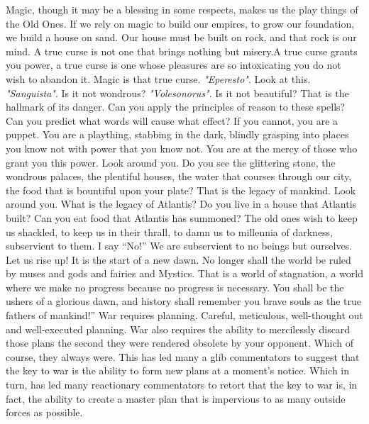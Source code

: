 Magic, though it may be a blessing in some respects, makes us the play things of the Old Ones. If we rely on magic to build our empires, to grow our foundation, we build a house on sand. Our house must be built on rock, and that rock is our mind. A true curse is not one that brings nothing but misery.\SmallVSpace A true curse grants you power, a true curse is one whose pleasures are so intoxicating you do not wish to abandon it. Magic is that true curse.
\SmallVSpace
\emph{"Eperesto"}. Look at this. \emph{"Sanguista"}. Is it not wondrous? \emph{"Volesonorus"}. Is it not beautiful? That is the hallmark of its danger. Can you apply the principles of reason to these spells? Can you predict what words will cause what effect? If you cannot, you are a puppet. You are a plaything, stabbing in the dark, blindly grasping into places you know not with power that you know not. You are at the mercy of those who grant you this power.
\SmallVSpace
Look around you.
\SmallVSpace
Do you see the glittering stone, the wondrous palaces, the plentiful houses, the water that courses through our city, the food that is bountiful upon your plate? That is the legacy of mankind.
\SmallVSpace
Look around you.
\SmallVSpace
What is the legacy of Atlantis? Do you live in a house that Atlantis built? Can you eat food that Atlantis has summoned? The old ones wish to keep us shackled, to keep us in their thrall, to damn us to millennia of darkness, subservient to them. I say “No!” We are subservient to no beings but ourselves.
\SmallVSpace
Let us rise up! It is the start of a new dawn. No longer shall the world be ruled by muses and gods and fairies and Mystics. That is a world of stagnation, a world where we make no progress because no progress is necessary. You shall be the ushers of a glorious dawn, and history shall remember you brave souls as the true fathers of mankind!”
\simpleline
War requires planning. Careful, meticulous, well-thought out and well-executed planning. War also requires the ability to mercilessly discard those plans the second they were rendered obsolete by your opponent. Which of course, they always were. This has led many a glib commentators to suggest that the key to war is the ability to form new plans at a moment’s notice. Which in turn, has led many reactionary commentators to retort that the key to war is, in fact, the ability to create a master plan that is impervious to as many outside forces as possible.

